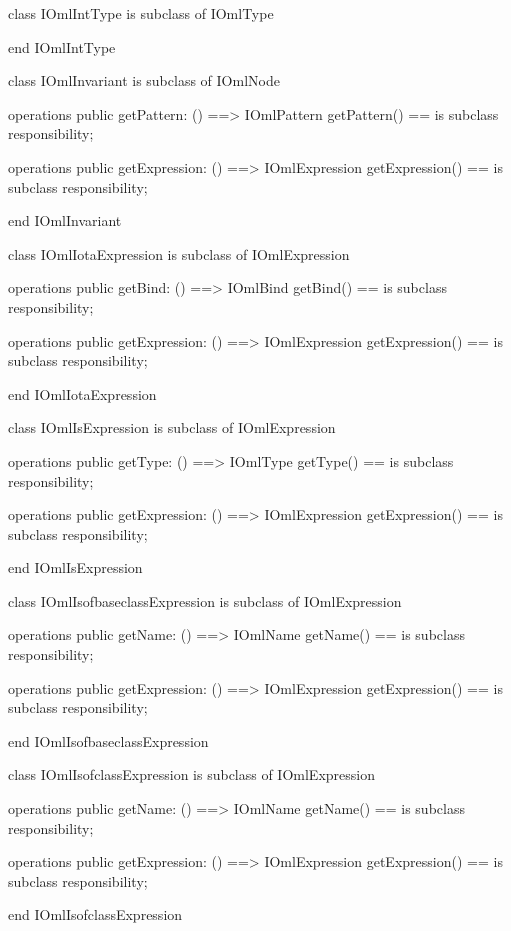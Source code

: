 \begin{vdm_al}
class IOmlIntType
 is subclass of IOmlType

end IOmlIntType
\end{vdm_al}

\begin{vdm_al}
class IOmlInvariant
 is subclass of IOmlNode

operations
  public getPattern: () ==> IOmlPattern
  getPattern() == is subclass responsibility;

operations
  public getExpression: () ==> IOmlExpression
  getExpression() == is subclass responsibility;

end IOmlInvariant
\end{vdm_al}

\begin{vdm_al}
class IOmlIotaExpression
 is subclass of IOmlExpression

operations
  public getBind: () ==> IOmlBind
  getBind() == is subclass responsibility;

operations
  public getExpression: () ==> IOmlExpression
  getExpression() == is subclass responsibility;

end IOmlIotaExpression
\end{vdm_al}

\begin{vdm_al}
class IOmlIsExpression
 is subclass of IOmlExpression

operations
  public getType: () ==> IOmlType
  getType() == is subclass responsibility;

operations
  public getExpression: () ==> IOmlExpression
  getExpression() == is subclass responsibility;

end IOmlIsExpression
\end{vdm_al}

\begin{vdm_al}
class IOmlIsofbaseclassExpression
 is subclass of IOmlExpression

operations
  public getName: () ==> IOmlName
  getName() == is subclass responsibility;

operations
  public getExpression: () ==> IOmlExpression
  getExpression() == is subclass responsibility;

end IOmlIsofbaseclassExpression
\end{vdm_al}

\begin{vdm_al}
class IOmlIsofclassExpression
 is subclass of IOmlExpression

operations
  public getName: () ==> IOmlName
  getName() == is subclass responsibility;

operations
  public getExpression: () ==> IOmlExpression
  getExpression() == is subclass responsibility;

end IOmlIsofclassExpression
\end{vdm_al}

